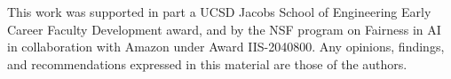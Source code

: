 \documentclass[sigconf]{acmart}
\begin{document}






\begin{acks}
This work was supported in part a UCSD Jacobs School of Engineering Early Career Faculty Development award, and by the NSF program on Fairness in AI in collaboration with Amazon under Award IIS-2040800. Any opinions, findings, and recommendations expressed in this material are those of the authors.
\end{acks}






\clearpage

\appendix

\end{document}
